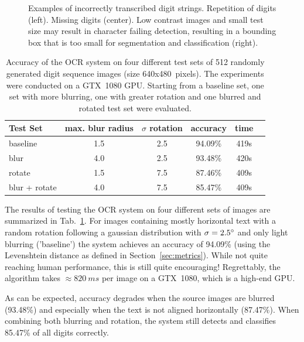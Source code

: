 \documentclass[12pt]{article}
\newcommand\secref[1]{Section~\ref{sec:#1}}
\newcommand\tabref[1]{Tab.~\ref{tab:#1}}
\begin{document}
\begin{figure}[t]
{    }
    \caption{
      Examples of incorrectly transcribed digit strings. Repetition of digits (left).
      Missing digits (center). Low contrast images and small test size may result in character failing detection,
      resulting in a bounding box that is too small for segmentation and classification (right).
    }
    \label{fig:bad_examples_pipeline}
\end{figure}


\begin{table}[h!]
\centering
\caption{Accuracy of the OCR system on four different test sets of 512 randomly generated
digit sequence images (size 640x480~pixels). The experiments were conducted on a GTX~1080 GPU.
Starting from a baseline set, one set with more blurring, one with greater rotation and
one blurred and rotated test set were evaluated.}
\label{tab:results_ocr}
\begin{tabular}{|l|c|c|c|c|c|}
\hline
\rowcolor{lightgray} Test Set & max. blur radius & $\sigma$ rotation & accuracy     & time \\
\hline
baseline       &   1.5            & 2.5               & 94.09\%    &  419s \\
blur           &   4.0            & 2.5               & 93.48\%    &  420s \\
rotate         &   1.5            & 7.5               & 87.46\%    &  409s \\
blur + rotate  &   4.0            & 7.5               & 85.47\%    &  409s \\
\hline
\end{tabular}
\end{table}


The results of testing the OCR system on four different sets of images are summarized in
\tabref{results_ocr}. For images containing mostly horizontal text with a random rotation
following a gaussian distribution with $\sigma = 2.5\degree$ and only light blurring
('baseline') the system achieves an accuracy of 94.09\% (using the Levenshtein distance as
defined in \secref{metrics}). While not quite reaching human performance, this is still
quite encouraging! Regrettably, the algorithm takes $\approx 820~ms$ per image on a
GTX~1080, which is a high-end GPU.

As can be expected, accuracy degrades when the source images are blurred (93.48\%) and
especially when the text is not aligned horizontally (87.47\%). When combining both
blurring and rotation, the system still detects and classifies 85.47\% of all digits
correctly.
\end{document}
